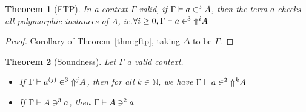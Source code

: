 \documentclass[preprint
              , authoryear
              , onecolumn
              ]{sigplanconf}
\newtheorem{theorem}{Theorem}
\newcommand{\ie}{\emph{ie.}\xspace}
\newcommand{\N}{\mathbb{N}}
\begin{document}

\begin{theorem}[FTP]

In a context $\Gamma$ valid, if $\Gamma \vdash \pullN{a}{3}{A}$, then
the term $a$ checks all polymorphic instances of $A$, \ie $\forall i
\geq 0, \Gamma \vdash \pullN{a}{3}{\Up{i}{A}}$

\end{theorem}


\begin{proof}

Corollary of Theorem~\ref{thm:gftp}, taking $\Delta$ to be $\Gamma$.

\end{proof}


\begin{theorem}[Soundness]

Let $\Gamma$ a valid context.

\begin{itemize}
\item If \xspace$\Gamma \vdash \pullN{a^{(j)}}{3}{\Up{j}{A}}$, then for all 
      $k \in \N$, we have $\Gamma \vdash \pullN{a}{2}{\Up{k}{A}}$
\item If \xspace$\Gamma \vdash \pushN{a}{3}{A}$, then 
      $\Gamma \vdash \pushN{a}{2}{A}$
\end{itemize}

\end{theorem}

\end{document}

